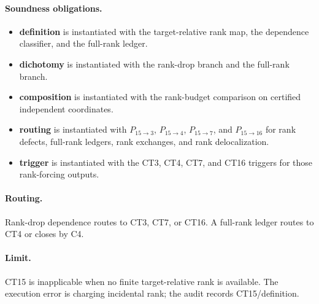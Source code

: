\documentclass[
  11pt,
]{article}
\providecommand{\tightlist}{%
  \setlength{\itemsep}{0pt}\setlength{\parskip}{0pt}}
\theoremstyle{definition}
\newcommand{\ctpar}[1]{\paragraph{#1.}}
\begin{document}
\ctpar{Soundness obligations}
\begin{itemize}
\tightlist
\item \textbf{definition} is instantiated with the target-relative rank map, the dependence classifier, and the full-rank ledger.
\item \textbf{dichotomy} is instantiated with the rank-drop branch and the full-rank branch.
\item \textbf{composition} is instantiated with the rank-budget comparison on certified independent coordinates.
\item \textbf{routing} is instantiated with \(P_{15\to3}\), \(P_{15\to4}\), \(P_{15\to7}\), and \(P_{15\to16}\) for rank defects, full-rank ledgers, rank exchanges, and rank delocalization.
\item \textbf{trigger} is instantiated with the CT3, CT4, CT7, and CT16 triggers for those rank-forcing outputs.
\end{itemize}

\ctpar{Routing}
Rank-drop dependence routes to CT3, CT7, or CT16.  A full-rank ledger
routes to CT4 or closes by C4.

\ctpar{Limit}
CT15 is inapplicable when no finite target-relative rank is available. The
execution error is charging incidental rank; the audit records
CT15/definition.
\end{document}
